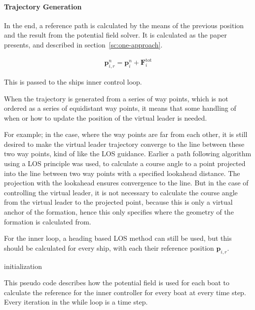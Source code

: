 \paragraph{Trajectory Generation}
In the end, a reference path is calculated by the means of the
previous position and the result from the potential field
solver. It is calculated as the paper presents, \citep[eq.
48]{UAVff3dpf} and described in section~\vref{sc:one-approach}.

\begin{align}
	\mathbf{p}_{i,r}^n = \mathbf{p}_i^n + \mathbf{F}_i ^\text{tot}
\end{align}

This is passed to the ships inner control loop.

When the trajectory is generated from a series of way points, which is
not ordered as a series of equidistant way points, it means that some
handling of when or how to update the position of the virtual leader
is needed.

For example; in the case, where the way points are far from each
other, it is still desired to make the virtual leader trajectory
converge to the line between these two way points, kind of like the
\ac{LOS} guidance. Earlier a path following algorithm using a \ac{LOS}
principle was used, to calculate a course angle to a point projected
into the line between two way points with a specified lookahead
distance. The projection with the lookahead ensures convergence to the
line. But in the case of controlling the virtual leader, it is not
necessary to calculate the course angle from the virtual leader to the
projected point, because this is only a virtual anchor of the
formation, hence this only specifies where the geometry of the
formation is calculated from. 

For the inner loop, a heading based \ac{LOS} method can still be used,
but this should be calculated for every ship, with each their
reference position $\mathbf{p}_{i,r}$.

\begin{algorithm}[H]
	initialization\;
	\caption{This pseudo code describes how the potential field is used
	for each boat to calculate the reference for the inner controller
	for every boat at every time step. Every iteration in the while loop
	is a time step.\vspace{6pt}}
	\label{al:potfield}
\end{algorithm}

